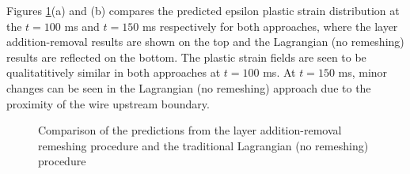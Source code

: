 \documentclass[sn-mathphys,Numbered]{sn-jnl}%
\begin{document}
Figures \ref{fig:benchmarkLayersPeeq}(a) and (b) compares the predicted epsilon plastic strain distribution at the $t = 100$ ms and $t = 150$ ms respectively for both approaches, where the layer addition-removal results are shown on the top and the Lagrangian (no remeshing) results are reflected on the bottom.
The plastic strain fields are seen to be qualitatitively similar in both approaches at $t = 100$ ms.
At $t = 150$ ms, minor changes can be seen in the Lagrangian (no remeshing) approach due to the proximity of the wire upstream boundary.
\begin{figure}[htb]
	\centering
		\caption{Comparison of the predictions from the layer addition-removal remeshing procedure and the traditional Lagrangian (no remeshing) procedure}
	\label{fig:benchmarkLayersPeeq}
\end{figure}
\end{document}

